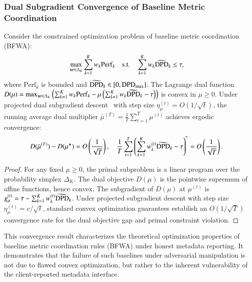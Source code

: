 \subsubsection{Dual Subgradient Convergence of Baseline Metric Coordination}
\label{subsubsec:theory_bfwa}
\begin{theorem}
\label{thm:bfwa_dual_convergence}
Consider the constrained optimization problem of baseline metric coordination (BFWA):
\begin{equation}
\label{eq:bfwa_opt}
\max_{\bm{w} \in \Delta_K} \sum_{k=1}^K w_k \mathrm{Perf}_k \quad \text{s.t.} \quad \sum_{k=1}^K w_k \widetilde{\mathrm{DPD}}_k \le \tau,
\end{equation}
where $\mathrm{Perf}_k$ is bounded and $\widetilde{\mathrm{DPD}}_k \in [0, \mathrm{DPD}_{\max}]$. The Lagrange dual function $D(\mu) = \max_{\bm{w} \in \Delta_K} \left( \sum_{k=1}^K w_k \mathrm{Perf}_k - \mu \left(\sum_{k=1}^K w_k \widetilde{\mathrm{DPD}}_k - \tau\right) \right)$ is convex in $\mu \ge 0$. Under projected dual subgradient descent~\citep{boyd2004convex} with step size $\eta_\mu^{(t)} = O(1/\sqrt{t})$, the running average dual multiplier $\bar{\mu}^{(T)} = \frac{1}{T}\sum_{t=1}^T \mu^{(t)}$ achieves ergodic convergence:
\begin{equation}
\label{eq:dual_conv}
D(\bar{\mu}^{(T)}) - D(\mu^\star) = O\left(\frac{1}{\sqrt{T}}\right), \quad \frac{1}{T}\sum_{t=1}^T \left( \sum_{k=1}^K w_k^{(t)} \widetilde{\mathrm{DPD}}_k - \tau \right)^{\!+} = O\left(\frac{1}{\sqrt{T}}\right).
\end{equation}
\end{theorem}
\begin{proof}
For any fixed $\mu \ge 0$, the primal subproblem is a linear program over the probability simplex $\Delta_K$. The dual objective $D(\mu)$ is the pointwise supremum of affine functions, hence convex. The subgradient of $D(\mu)$ at $\mu^{(t)}$ is $g_\mu^{(t)} = \tau - \sum_{k=1}^K w_k^{(t)} \widetilde{\mathrm{DPD}}_k$. Under projected subgradient descent with step size $\eta_\mu^{(t)} = c/\sqrt{t}$, standard convex optimization guarantees establish an $O(1/\sqrt{T})$ convergence rate for the dual objective gap and primal constraint violation.
\end{proof}

\begin{remark}
This convergence result characterizes the theoretical optimization properties of baseline metric coordination rules (BFWA) under honest metadata reporting. It demonstrates that the failure of such baselines under adversarial manipulation is not due to flawed convex optimization, but rather to the inherent vulnerability of the client-reported metadata interface.
\end{remark}

